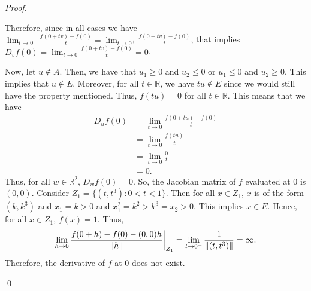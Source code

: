 \documentclass[12pt]{article}
\newenvironment{sol}
    {\emph{Proof.}
    }
    {
    \qed
    }
\newcommand\restr[2]{{%
  \left.\kern-\nulldelimiterspace %
  #1 %
  \vphantom{\big|} %
  \right|_{#2} %
  }}
\begin{document}
\begin{sol}
Therefore, since in all cases we have $\lim_{t \to 0^-} \frac{f(0 + tv) - f(0)}{t} = \lim_{t \to 0^+} \frac{f(0 + tv) - f(0)}{t}$, that implies $D_vf(0) = \lim_{t \to 0} \frac{f(0 + tv) - f(0)}{t} = 0$. 

Now, let $u \not\in A$. Then, we have that $u_1 \geq 0$ and $u_2 \leq 0$ or $u_1 \leq 0$ and $u_2 \geq 0$. This implies that $u \not \in E$. Moreover, for all $t \in \mathbb{R}$, we have $tu \not\in E$ since we would still have the property mentioned. Thus, $f(tu) = 0$ for all $t \in \mathbb{R}$. This means that we have \begin{align*}
    D_uf(0) &= \lim_{t \to 0} \frac{f(0 + tu) - f(0)}{t} \\ &= \lim_{t \to 0} \frac{f(tu)}{t} \\ &= \lim_{t \to 0} \frac{0}{t} \\ &= 0.
\end{align*}
Thus, for all $w \in \mathbb{R}^2$, $D_wf(0) = 0$. So, the Jacobian matrix of $f$ evaluated at $0$ is $(0, 0)$. Consider $Z_1 = \{(t, t^3) : 0 < t < 1\}$. Then for all $x \in Z_1$, $x$ is of the form $(k, k^3)$ and $x_1 = k > 0$ and $x_1^2 = k^2 > k^3 = x_2 > 0$. This implies $x \in E$. Hence, for all $x \in Z_1$, $f(x) = 1$. Thus, $$\lim_{h \to 0} \restr{\frac{f(0 + h) - f(0) - (0, 0)h}{\lVert h \rVert}}{Z_1} = \lim_{t \to 0^+} \frac{1}{\lVert (t, t^3) \rVert} = \infty.$$ Therefore, the derivative of $f$ at $0$ does not exist.
\end{sol}


\end{document}
